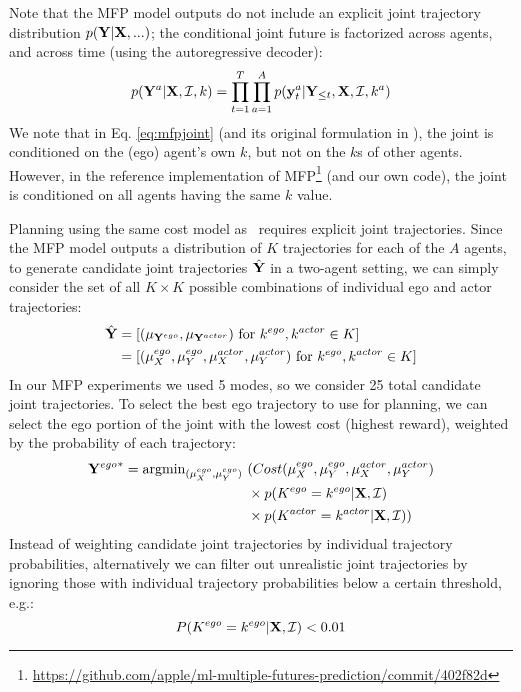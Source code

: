 Note that the MFP model outputs do not include an explicit joint trajectory distribution $p(\mathbf{Y} | \mathbf{X}, ...)$; the conditional joint future is factorized across agents, and across time (using the autoregressive decoder):
\begin{equation}\label{eq:mfpjoint}
    p(\mathbf{Y}^a | \mathbf{X}, \mathcal{I}, k) = \prod_{t=1}^T \prod_{a=1}^A p(\mathbf{y}_t^a | \mathbf{Y}_{\leq t}, \mathbf{X}, \mathcal{I}, k^a)
\end{equation}
We note that in Eq. \ref{eq:mfpjoint} (and its original formulation in \cite{tang2019mfp}), the joint is conditioned on the (ego) agent's own $k$, but not on the $k$s of other agents. However, in the reference implementation of MFP\footnote{\href{https://github.com/apple/ml-multiple-futures-prediction/commit/402f82d}{https://github.com/apple/ml-multiple-futures-prediction/commit/402f82d}} (and our own code), the joint is conditioned on all agents having the same $k$ value.

Planning using the same cost model as \ours ~requires explicit joint trajectories.
Since the MFP model outputs a distribution of $K$ trajectories for each of the $A$ agents, to generate candidate joint trajectories $\hat{\mathbf{Y}}$ in a two-agent setting, we can simply consider the set of all $K \times K$ possible combinations of individual ego and actor trajectories:
\begin{equation}
\begin{aligned}
    \hat{\mathbf{Y}}
    & = [(\mu_{\mathbf{Y}^{ego}}, \mu_{\mathbf{Y}^{actor}}) ~\text{for}~ k^{ego}, k^{actor} \in K]
    \\& = [(\mu^{ego}_X,\mu^{ego}_Y,\mu^{actor}_X,\mu^{actor}_Y) ~\text{for}~ k^{ego}, k^{actor} \in K]
\end{aligned}
\end{equation}
In our MFP experiments we used 5 modes, so we consider 25 total candidate joint trajectories. To select the best ego trajectory to use for planning, we can select the ego portion of the joint with the lowest cost (highest reward), weighted by the probability of each trajectory:
\begin{equation}
\begin{aligned}
    {\mathbf{Y}^{ego}}^\ast = 
    \operatorname{argmin}_{(\mu^{ego}_X,\mu^{ego}_Y)}~
    & (Cost(\mu^{ego}_X,\mu^{ego}_Y,\mu^{actor}_X,\mu^{actor}_Y)
    \\& \times p(K^{ego}=k^{ego} | \mathbf{X}, \mathcal{I})
    \\& \times p(K^{actor}=k^{actor} | \mathbf{X}, \mathcal{I}))
\end{aligned}
\end{equation}
Instead of weighting candidate joint trajectories by individual trajectory probabilities, alternatively we can filter out unrealistic joint trajectories by ignoring those with individual trajectory probabilities below a certain threshold, e.g.:
\begin{equation*}
    P(K^{ego}=k^{ego} | \mathbf{X}, \mathcal{I}) < 0.01
\end{equation*}

